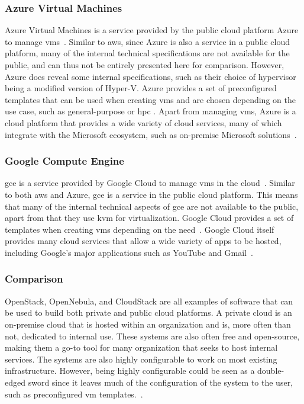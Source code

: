 \documentclass{kththesis}
\begin{document}
\subsubsection*{Azure Virtual Machines}
Azure Virtual Machines is a service provided by the public cloud platform Azure to manage \Glspl{vm}\ \cite{azure-overview, azure-cost-effective}. Similar to \Gls{aws}, since Azure is also a service in a public cloud platform, many of the internal technical specifications are not available for the public, and can thus not be entirely presented here for comparison. However, Azure does reveal some internal specifications, such as their choice of hypervisor being a modified version of Hyper-V. Azure provides a set of preconfigured templates that can be used when creating \Glspl{vm} and are chosen depending on the use case, such as general-purpose or \Gls{hpc} \cite{azure-overview-web}. Apart from managing \Glspl{vm}, Azure is a cloud platform that provides a wide variety of cloud services, many of which integrate with the Microsoft ecosystem, such as on-premise Microsoft solutions\ \cite{azure-aws-gcp-comparison}. 

\subsubsection*{Google Compute Engine}
\Gls{gce} is a service provided by Google Cloud to manage \Glspl{vm} in the cloud\ \cite{gce-overview-web}. Similar to both \Gls{aws} and Azure, \Gls{gce} is a service in the public cloud platform. This means that many of the internal technical aspects of \Gls{gce} are not available to the public, apart from that they use \Gls{kvm} for virtualization. Google Cloud provides a set of templates when creating \Glspl{vm} depending on the need\ \cite{gce-overview}. Google Cloud itself provides many cloud services that allow a wide variety of apps to be hosted, including Google's major applications such as YouTube and Gmail\ \cite{azure-aws-gcp-comparison}. 

\subsubsection{Comparison}
\label{vm-management-comparison}
OpenStack, OpenNebula, and CloudStack are all examples of software that can be used to build both private and public cloud platforms. A private cloud is an on-premise cloud that is hosted within an organization and is, more often than not, dedicated to internal use. These systems are also often free and open-source, making them a go-to tool for many organization that seeks to host internal services. The systems are also highly configurable to work on most existing infrastructure. However, being highly configurable could be seen as a double-edged sword since it leaves much of the configuration of the system to the user, such as preconfigured \Gls{vm} templates.\ \cite{public-private-cloud, hybrid-cloud}. 
\end{document}
